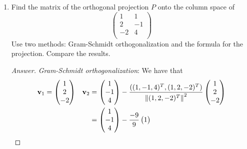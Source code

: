 \documentclass[../psets.tex]{subfiles}
\begin{document}
\begin{enumerate}[label={\textbf{4.\arabic*.}}]
    \item Find the matrix of the orthogonal projection $P$ onto the column space of
    \begin{equation*}
        \begin{pmatrix}
            1 & 1\\
            2 & -1\\
            -2 & 4\\
        \end{pmatrix}
    \end{equation*}
    Use two methods: Gram-Schmidt orthogonalization and the formula for the projection. Compare the results.
    \begin{proof}[Answer]
        \emph{Gram-Schmidt orthogonalization}: We have that
        \begin{align*}
            \mathbf{v}_1 &=
            \begin{pmatrix}
                1\\
                2\\
                -2\\
            \end{pmatrix}&
                \mathbf{v}_2 &=
                \begin{pmatrix}
                    1\\
                    -1\\
                    4\\
                \end{pmatrix}
                -\frac{((1,-1,4)^T,(1,2,-2)^T)}{\norm{(1,2,-2)^T}^2}
                \begin{pmatrix}
                    1\\
                    2\\
                    -2\\
                \end{pmatrix}\\
            &&
                &=
                \begin{pmatrix}
                    1\\
                    -1\\
                    4\\
                \end{pmatrix}
                -\frac{-9}{9}
                \begin{pmatrix}
                    1\\

\end{pmatrix}
\end{align*}
\end{proof}
\end{enumerate}
\end{document}
